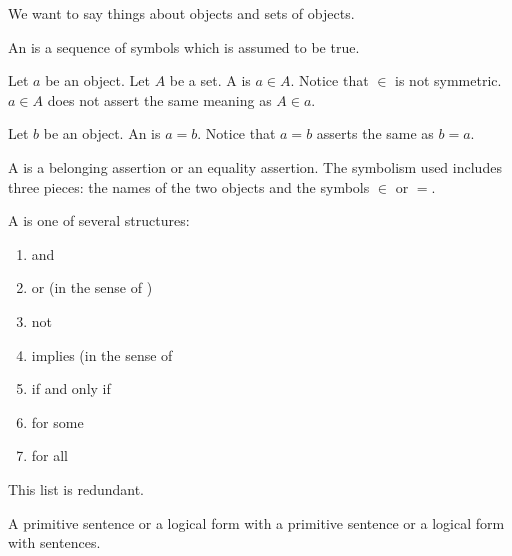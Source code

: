 

We want to say things
about objects and sets
of objects.


An 
is a sequence of symbols
which is assumed to be true.

Let $a$ be an object.
Let $A$ be a set.
A 
is $a \in A$.
Notice that $\in$ is not symmetric.
$a \in A$ does not assert the same
meaning as
$A \in a$.

Let $b$ be an object.
An 
is $a = b$.
Notice that $a = b$
asserts the same as $b = a$.

A 
is a belonging assertion
or an equality assertion.
The symbolism used includes
three pieces: the names of the two
objects and the symbols $\in$ or $=$.

A  is one of
several structures:
\begin{enumerate}

  \item

    and

  \item

    or (in the sense of )

  \item

    not

  \item

    implies (in the sense of 

  \item

    if and only if

  \item

    for some

  \item

    for all
\end{enumerate}

This list is redundant.

A  primitive sentence
or a logical form with a primitive
sentence or a logical form with
sentences.
